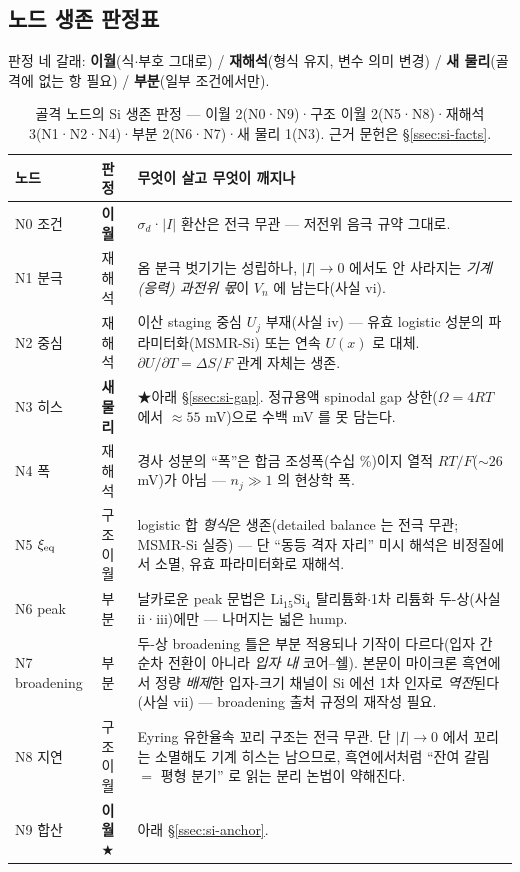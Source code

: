 \subsection{노드 생존 판정표}\label{ssec:si-map}
판정 네 갈래: \textbf{이월}(식$\cdot$부호 그대로) / \textbf{재해석}(형식 유지, 변수 의미
변경) / \textbf{새 물리}(골격에 없는 항 필요) / \textbf{부분}(일부 조건에서만).

\begin{table}[h]
\centering
\small
\begin{tabular}{p{} p{} p{}}
\toprule
노드 & 판정 & 무엇이 살고 무엇이 깨지나 \\
\midrule
N0 조건 & \textbf{이월} & $\sigma_d$·$|I|$ 환산은 전극 무관 --- 저전위 음극 규약 그대로. \\
N1 분극 & 재해석 & 옴 분극 벗기기는 성립하나, $|I|\to0$ 에서도 안 사라지는 \emph{기계(응력) 과전위 몫}이 $V_n$ 에 남는다(사실 vi). \\
N2 중심 & 재해석 & 이산 staging 중심 $U_j$ 부재(사실 iv) --- 유효 logistic 성분의 파라미터화(MSMR-Si\cite{verbrugge_lisi2016}) 또는 연속 $U(x)$\cite{chevrier_dahn2009} 로 대체. $\partial U/\partial T=\Delta S/F$ 관계 자체는 생존. \\
N3 히스 & \textbf{새 물리} & ★아래 \S\ref{ssec:si-gap}. 정규용액 spinodal gap 상한($\Omega{=}4RT$ 에서 $\approx55$ mV)으로 수백 mV 를 못 담는다. \\
N4 폭 & 재해석 & 경사 성분의 ``폭''은 합금 조성폭(수십 \%)이지 열적 $RT/F$($\sim26$ mV)가 아님 --- $n_j\gg1$ 의 현상학 폭. \\
N5 $\xi_{\mathrm{eq}}$ & 구조 이월 & logistic 합 \emph{형식}은 생존(detailed balance 는 전극 무관; MSMR-Si 실증\cite{verbrugge_lisi2016}) --- 단 ``동등 격자 자리'' 미시 해석은 비정질에서 소멸, 유효 파라미터화로 재해석. \\
N6 peak & 부분 & 날카로운 peak 문법은 Li$_{15}$Si$_4$ 탈리튬화$\cdot$1차 리튬화 두-상(사실 ii·iii)에만 --- 나머지는 넓은 hump. \\
N7 broadening & 부분 & 두-상 broadening 틀은 부분 적용되나 기작이 다르다(입자 간 순차 전환이 아니라 \emph{입자 내} 코어--쉘). 본문이 마이크론 흑연에서 정량 \emph{배제}한 입자-크기 채널이 Si 에선 1차 인자로 \emph{역전}된다(사실 vii) --- broadening 출처 규정의 재작성 필요. \\
N8 지연 & 구조 이월 & Eyring 유한율속 꼬리 구조는 전극 무관. 단 $|I|\to0$ 에서 꼬리는 소멸해도 기계 히스는 남으므로, 흑연에서처럼 ``잔여 갈림 $=$ 평형 분기'' 로 읽는 분리 논법이 약해진다. \\
N9 합산 & \textbf{이월}★ & 아래 \S\ref{ssec:si-anchor}. \\
\bottomrule
\end{tabular}
\caption{골격 노드의 Si 생존 판정 --- 이월 2(N0·N9)·구조 이월 2(N5·N8)·재해석 3(N1·N2·N4)·부분
2(N6·N7)·새 물리 1(N3). 근거 문헌은 \S\ref{ssec:si-facts}.}
\label{tab:simap}
\end{table}

